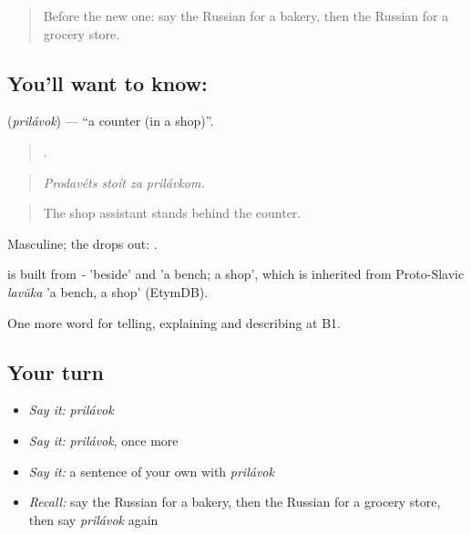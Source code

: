 \label{lesson:RU-C452-prilavok}



\begin{quote}
Before the new one: say the Russian for a bakery, then the Russian for a grocery store.
\end{quote}

\subsection*{You'll want to know: }
\textbf{} (\emph{prilávok}) — \textquotedblleft{}a counter (in a shop)\textquotedblright{}.

\begin{quote}
   .
\end{quote}

\begin{quote}
\emph{Prodavéts stoít za prilávkom.}
\end{quote}

\begin{quote}
The shop assistant stands behind the counter.
\end{quote}

Masculine; the  drops out: \emph{}.

\begin{cousinweb}
\emph{} is built from \emph{-} 'beside' and \emph{} 'a bench; a shop', which is inherited from Proto-Slavic \emph{lavŭka} 'a bench, a shop' (EtymDB).
\end{cousinweb}

\begin{grammarlens}[title={What you've built}]
One more word for telling, explaining and describing at B1.
\end{grammarlens}

\subsection*{Your turn}
\begin{itemize}
\raggedright
  \item \emph{Say it:} \emph{prilávok}
  \item \emph{Say it:} \emph{prilávok}, once more
  \item \emph{Say it:} a sentence of your own with \emph{prilávok}
  \item \emph{Recall:} say the Russian for a bakery, then the Russian for a grocery store, then say \emph{prilávok} again
\end{itemize}


